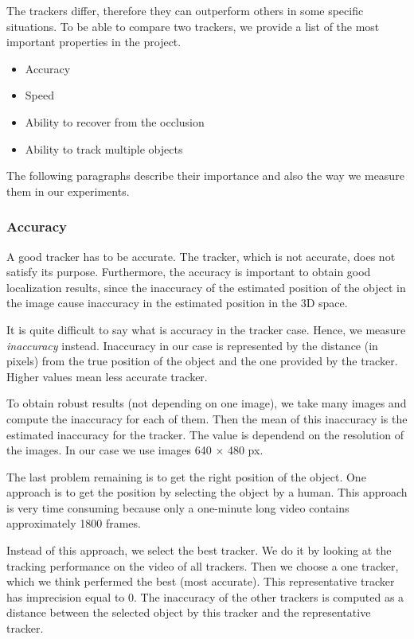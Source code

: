 The trackers differ, therefore they can outperform others in some specific
situations. To be able to compare two trackers, we provide a list of the most
important properties in the project.

\begin{itemize}
	\item Accuracy
	\item Speed
	\item Ability to recover from the occlusion
	\item Ability to track multiple objects
\end{itemize}

The following paragraphs describe their importance and also the way we measure them
in our experiments.

\subsubsection*{Accuracy}

A good tracker has to be accurate. The tracker, which is not accurate, does not
satisfy its purpose. Furthermore, the accuracy is important to obtain good
localization results, since the inaccuracy of the estimated position of the
object in the image cause inaccuracy in the estimated position in the 3D space.

It is quite difficult to say what is accuracy in the tracker case. Hence, we
measure \emph{inaccuracy} instead. Inaccuracy in our case is represented by the
distance (in pixels) from the true position of the object and the one provided
by the tracker. Higher values mean less accurate tracker.

To obtain robust results (not depending on one image), we take many images and
compute the inaccuracy for each of them. Then the mean of this inaccuracy is
the estimated inaccuracy for the tracker. The value is dependend on the
resolution of the images. In our case we use images 640 $\times$ 480 px.

The last problem remaining is to get the right position of the object. One
approach is to get the position by selecting the object by a human. This
approach is very time consuming because only a one-minute long video contains
approximately 1800 frames.

Instead of this approach, we select the best tracker. We do it by looking at
the tracking performance on the video of all trackers. Then we choose a one
tracker, which we think perfermed the best (most accurate). This representative
tracker has imprecision equal to 0.  The inaccuracy of the other trackers is
computed as a distance between the selected object by this tracker and the
representative tracker. 


